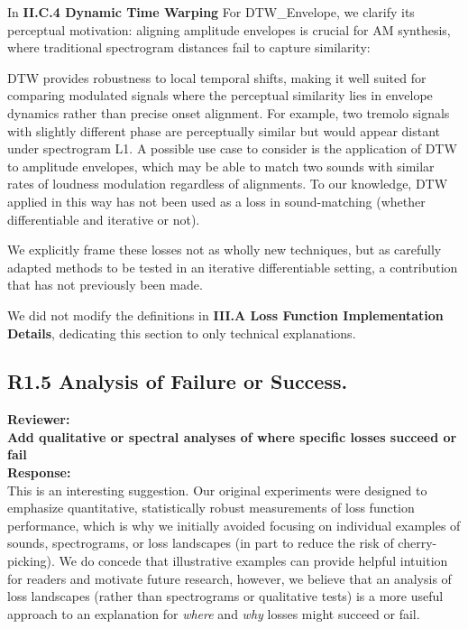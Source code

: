 \documentclass[11pt]{article}
\begin{document}
 In \textbf{II.C.4 Dynamic Time Warping} For DTW\_Envelope, we clarify its perceptual motivation: aligning amplitude envelopes is crucial for AM synthesis, where traditional spectrogram distances fail to capture similarity: 
 \begin{displayquote}
     DTW provides robustness to local temporal shifts, making it well suited for comparing modulated signals where the perceptual similarity lies in envelope dynamics rather than precise onset alignment. 
    For example, two tremolo signals with slightly different phase are perceptually similar but would appear distant under spectrogram L1. 
    A possible use case to consider is the application of DTW to amplitude envelopes, which may be able to match two sounds with similar rates of loudness modulation regardless of alignments. 
    To our knowledge, DTW applied in this way has not been used as a loss in sound-matching (whether differentiable and iterative or not).
 \end{displayquote}
 
 We explicitly frame these losses not as wholly new techniques, but as carefully adapted methods to be tested in an iterative differentiable setting, a contribution that has not previously been made.  

We did not modify the definitions in \textbf{III.A Loss Function Implementation Details}, dedicating this section to only technical explanations. 

\subsection*{R1.5 Analysis of Failure or Success.}
\label{R1.5}
\noindent\textbf{Reviewer:} \\
\textbf{Add qualitative or spectral analyses of where specific losses succeed or fail}\\

\noindent\textbf{Response:} \\
This is an interesting suggestion. Our original experiments were designed to emphasize quantitative, statistically robust measurements of loss function performance, which is why we initially avoided focusing on individual examples of sounds, spectrograms, or loss landscapes (in part to reduce the risk of cherry-picking). We do concede that illustrative examples can provide helpful intuition for readers and motivate future research, however, we believe that an analysis of loss landscapes (rather than spectrograms or qualitative tests) is a more useful approach to an explanation for \textit{where} and \textit{why} losses might succeed or fail.
\end{document}
